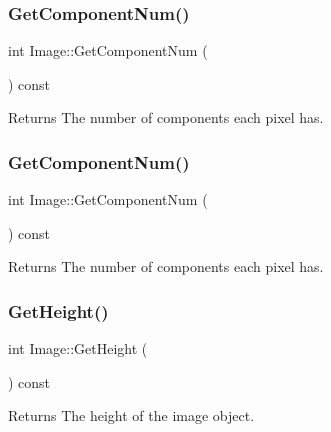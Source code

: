 \subsubsection{\texorpdfstring{Get\+Component\+Num()}{GetComponentNum()}\hspace{0.1cm}{\footnotesize\ttfamily [1/2]}}
{\footnotesize\ttfamily int Image\+::\+Get\+Component\+Num (\begin{DoxyParamCaption}{ }\end{DoxyParamCaption}) const}

\begin{DoxyReturn}{Returns}
The number of components each pixel has. 
\end{DoxyReturn}
\mbox{\label{classImage_aec11158c35b24ba60a835c877d791b36}} 
\subsubsection{\texorpdfstring{Get\+Component\+Num()}{GetComponentNum()}\hspace{0.1cm}{\footnotesize\ttfamily [2/2]}}
{\footnotesize\ttfamily int Image\+::\+Get\+Component\+Num (\begin{DoxyParamCaption}{ }\end{DoxyParamCaption}) const}

\begin{DoxyReturn}{Returns}
The number of components each pixel has. 
\end{DoxyReturn}
\mbox{\label{classImage_a631ead4be012caf49b3209d2ac401214}} 
\subsubsection{\texorpdfstring{Get\+Height()}{GetHeight()}\hspace{0.1cm}{\footnotesize\ttfamily [1/2]}}
{\footnotesize\ttfamily int Image\+::\+Get\+Height (\begin{DoxyParamCaption}{ }\end{DoxyParamCaption}) const}

\begin{DoxyReturn}{Returns}
The height of the image object. 
\end{DoxyReturn}
\mbox{\label{classImage_a631ead4be012caf49b3209d2ac401214}} 

